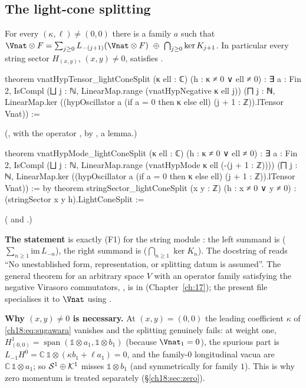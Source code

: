 \subsection{The light-cone splitting}

\begin{theorem}\label{ch18:thm:F1}
For every $(\kappa,\ell)\neq(0,0)$ there is a family $a$ such that
$\Vnat\otimes F=\sum_{j\ge0}L_{-(j+1)}(\Vnat\otimes F)\ \oplus\ \bigcap_{j\ge0}\ker K_{j+1}$.  In particular every
string sector $H_{(x,y)}$, $(x,y)\neq0$, satisfies .
\end{theorem}
\begin{leancode}
theorem vnatHypTensor_lightConeSplit (κ ell : ℂ) (h : κ ≠ 0 ∨ ell ≠ 0) :
    ∃ a : Fin 2, IsCompl (⨆ j : ℕ, LinearMap.range (vnatHypNegative κ ell j))
      (⨅ j : ℕ, LinearMap.ker
        ((hypOscillator a (if a = 0 then κ else ell) (j + 1 : ℤ)).lTensor Vnat)) :=
\end{leancode}
(, with  the operator
, by , a  lemma.)
\begin{leancode}
theorem vnatHypMode_lightConeSplit (κ ell : ℂ) (h : κ ≠ 0 ∨ ell ≠ 0) :
    ∃ a : Fin 2, IsCompl (⨆ j : ℕ, LinearMap.range (vnatHypMode κ ell (-(j + 1 : ℤ))))
      (⨅ j : ℕ, LinearMap.ker
        ((hypOscillator a (if a = 0 then κ else ell) (j + 1 : ℤ)).lTensor Vnat)) := by
theorem stringSector_lightConeSplit (x y : ℤ) (h : x ≠ 0 ∨ y ≠ 0) :
    (stringSector x y h).LightConeSplit :=
\end{leancode}
( and
.)
\begin{dictionary}
\textbf{The statement} is exactly (F1) for the string module : the left
summand is  ($\sum_{n\ge1}\mathrm{im}\,L_{-n}$), the right summand is 
($\bigcap_{n\ge1}\ker K_n$).  The docstring of  reads ``No
unestablished form, representation, or splitting datum is assumed''.  The general theorem for an
arbitrary space $V$ with an operator family satisfying the negative Virasoro commutators,
, is in
 (Chapter~\ref{ch:17}); the present file
specialises it to $\Vnat$ using .

\textbf{Why $(x,y)\neq0$ is necessary.}  At $(x,y)=(0,0)$ the leading coefficient $\kappa$ of
\eqref{ch18:eq:sugawara} vanishes and the splitting genuinely fails: at weight one,
$H^1_{(0,0)}=\operatorname{span}(\mathbb 1\otimes a_1,\mathbb 1\otimes b_1)$ (because $\Vnat_1=0$), the spurious part is
$L_{-1}H^0=\mathbb C\,\mathbb 1\otimes(\kappa b_1+\ell a_1)=0$, and the family-$0$ longitudinal vacua are
$\mathbb C\,\mathbb 1\otimes a_1$; so $\mathcal{S}^1\oplus\mathcal{K}^1$ misses $\mathbb 1\otimes b_1$ (and symmetrically for family $1$).  This is why zero momentum is treated separately (\S\ref{ch18:sec:zero}).
\end{dictionary}
